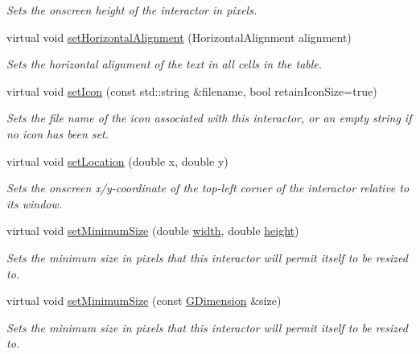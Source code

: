 \begin{DoxyCompactItemize}
\begin{DoxyCompactList}\small\item\em Sets the onscreen height of the interactor in pixels. \end{DoxyCompactList}\item 
virtual void \mbox{\hyperlink{classGTable_a04e6ce745dd0f9708f14dedc68ec8b18}{set\+Horizontal\+Alignment}} (Horizontal\+Alignment alignment)
\begin{DoxyCompactList}\small\item\em Sets the horizontal alignment of the text in all cells in the table. \end{DoxyCompactList}\item 
virtual void \mbox{\hyperlink{classGInteractor_a762e139aa311461c3984d3ad28293f64}{set\+Icon}} (const std\+::string \&filename, bool retain\+Icon\+Size=true)
\begin{DoxyCompactList}\small\item\em Sets the file name of the icon associated with this interactor, or an empty string if no icon has been set. \end{DoxyCompactList}\item 
virtual void \mbox{\hyperlink{classGInteractor_a04594e8ba9b98513a64f1da00dcae18c}{set\+Location}} (double x, double y)
\begin{DoxyCompactList}\small\item\em Sets the onscreen x/y-\/coordinate of the top-\/left corner of the interactor relative to its window. \end{DoxyCompactList}\item 
virtual void \mbox{\hyperlink{classGInteractor_a0cf428e207b7f22cc08138a90b1b87b2}{set\+Minimum\+Size}} (double \mbox{\hyperlink{classGTable_ad72663daf610f2a0833a2fc3d78e4fdf}{width}}, double \mbox{\hyperlink{classGTable_ad3774f6419003470f54fd495124ef51f}{height}})
\begin{DoxyCompactList}\small\item\em Sets the minimum size in pixels that this interactor will permit itself to be resized to. \end{DoxyCompactList}\item 
virtual void \mbox{\hyperlink{classGInteractor_a3b1046117ac6cb7abe467e00ba8a81f4}{set\+Minimum\+Size}} (const \mbox{\hyperlink{classGDimension}{G\+Dimension}} \&size)
\begin{DoxyCompactList}\small\item\em Sets the minimum size in pixels that this interactor will permit itself to be resized to. \end{DoxyCompactList}\item 

\end{DoxyCompactItemize}
